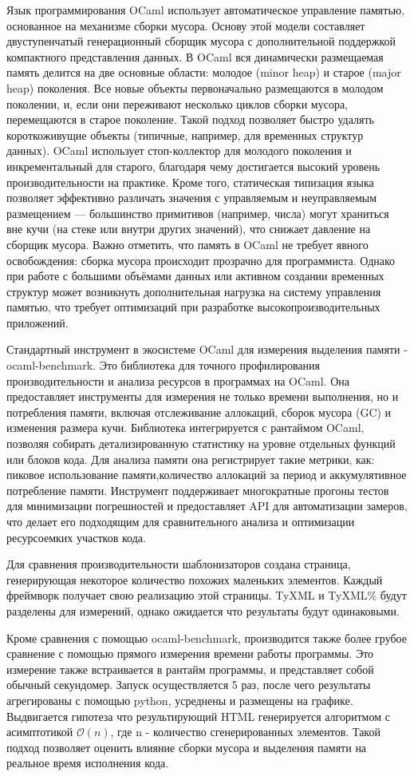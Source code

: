 Язык программирования OCaml использует автоматическое управление памятью, основанное на механизме сборки мусора\cite{ocamlMemoryModel}.
Основу этой модели составляет двуступенчатый генерационный сборщик мусора с дополнительной поддержкой компактного представления данных.
В OCaml вся динамически размещаемая память делится на две основные области: молодое (minor heap) и старое (major heap) поколения.
Все новые объекты первоначально размещаются в молодом поколении, и, если они переживают несколько циклов сборки мусора, перемещаются в старое поколение.
Такой подход позволяет быстро удалять короткоживущие объекты (типичные, например, для временных структур данных).
OCaml использует стоп-коллектор для молодого поколения и инкрементальный для старого, благодаря чему достигается высокий уровень производительности на практике.
Кроме того, статическая типизация языка позволяет эффективно различать значения с управляемым и неуправляемым размещением — большинство примитивов (например, числа) могут храниться вне кучи (на стеке или внутри других значений), что снижает давление на сборщик мусора.
Важно отметить, что память в OCaml не требует явного освобождения: сборка мусора происходит прозрачно для программиста.
Однако при работе с большими объёмами данных или активном создании временных структур может возникнуть дополнительная нагрузка на систему управления памятью, что требует оптимизаций при разработке высокопроизводительных приложений.

Стандартный инструмент в экосистеме OCaml для измерения выделения памяти - ocaml-benchmark.
Это библиотека для точного профилирования производительности и анализа ресурсов в программах на OCaml.
Она предоставляет инструменты для измерения не только времени выполнения, но и потребления памяти, включая отслеживание аллокаций, сборок мусора (GC) и изменения размера кучи.
Библиотека интегрируется с рантаймом OCaml, позволяя собирать детализированную статистику на уровне отдельных функций или блоков кода.
Для анализа памяти она регистрирует такие метрики, как: пиковое использование памяти,количество аллокаций за период и аккумулятивное потребление памяти.
Инструмент поддерживает многократные прогоны тестов для минимизации погрешностей и предоставляет API для автоматизации замеров, что делает его подходящим для сравнительного анализа и оптимизации ресурсоемких участков кода.

Для сравнения производительности шаблонизаторов создана страница, генерирующая некоторое количество похожих маленьких элементов.
Каждый фреймворк получает свою реализацию этой страницы.
TyXML и TyXML\% будут разделены для измерений, однако ожидается что результаты будут одинаковыми.

Кроме сравнения с помощью ocaml-benchmark, производится также более грубое сравнение с помощью прямого измерения времени работы программы.
Это измерение также встраивается в рантайм программы, и представляет собой обычный секундомер.
Запуск осуществляется 5 раз, после чего результаты агрегированы с помощью python, усреднены и размещены на графике.
Выдвигается гипотеза что результирующий HTML генерируется алгоритмом с асимптотикой $\mathcal{O}(n)$, где n - количество сгенерированных элементов.
Такой подход позволяет оценить влияние сборки мусора и выделения памяти на реальное время исполнения кода.
